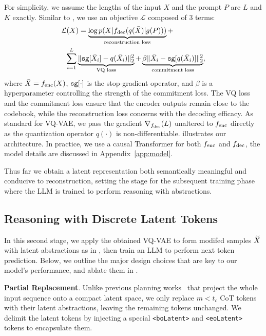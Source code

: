 For simplicity, we assume the lengths of the input $X$ and the prompt $P$ are $L$ and $K$ exactly.
Similar to \citet{van2017neural}, we use an objective $\mathcal{L}$ composed of 3 terms: 
\begin{equation}
\begin{aligned}
& \mathcal{L}(X) = \underbrace{ \log p(X | {f_\text{dec}}( q(\bar{X}) | g(P) ))}_{\text{reconstruction loss}} + \\
&  \hskip5pt \sum_{i=1}^L \underbrace{ \| {\texttt{sg}}[\bar{X}_i] - q(\bar{X}_i) \|_2^2}_{\text{VQ loss}} +  \underbrace{\beta \| \bar{X}_i - {\texttt{sg}}[q(\bar{X}_i)] \|_2^2}_{\text{commitment loss}},
\end{aligned}
\end{equation}
where $\bar{X} = {f_\text{enc}}(X)$, ${\texttt{sg}}[\cdot]$ is the stop-gradient operator, and \(\beta\) is a hyperparameter controlling the strength of the commitment loss.
The VQ loss and the commitment loss ensure that the encoder outputs remain close to the codebook, while the reconstruction loss concerns with the decoding efficacy. As standard for VQ-VAE, we pass the gradient $\nabla_{{f_\text{dec}}}(L)$ unaltered to ${f_\text{enc}}$ directly as the quantization operator $q(\cdot)$ is non-differentiable.  illustrates our architecture. In practice, we use a causal Transformer for both ${f_\text{enc}}$ and ${f_\text{dec}}$, the model details are discussed in Appendix~\ref{app:model}.


Thus far we obtain a latent representation both semantically meaningful and conducive to reconstruction, setting the stage for the subsequent training phase where
the LLM is trained to perform reasoning with abstractions.


\subsection{Reasoning with Discrete Latent Tokens}


In this second stage, we apply the obtained VQ-VAE to form modifed samples ${\widetilde{X}}$ with latent abstractions as in , then train an LLM to perform next token prediction. 
Below, we outline the major design choices that are key to our model's performance, and ablate them in .

\textbf{Partial Replacement}. Unlike previous planning works~\cite{jiang2022efficient, jiang2023h} that project the whole input sequence onto a compact latent space, we only replace $m < t_c$ CoT tokens with their latent abstractions, leaving the remaining tokens unchanged.  We delimit the latent tokens by injecting a special \texttt{<boLatent>} and \texttt{<eoLatent>} tokens to encapsulate them.

